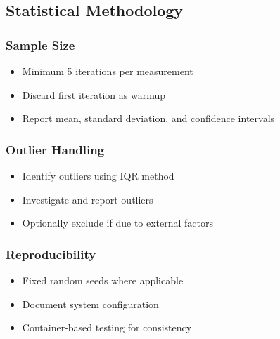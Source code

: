 \subsection{Statistical Methodology}

\subsubsection{Sample Size}

\begin{itemize}
    \item Minimum 5 iterations per measurement
       \item Discard first iteration as warmup
    \item Report mean, standard deviation, and confidence intervals
\end{itemize}

\subsubsection{Outlier Handling}

\begin{itemize}
    \item Identify outliers using IQR method
    \item Investigate and report outliers
    \item Optionally exclude if due to external factors
\end{itemize}

\subsubsection{Reproducibility}

\begin{itemize}
    \item Fixed random seeds where applicable
    \item Document system configuration
    \item Container-based testing for consistency
\end{itemize}
